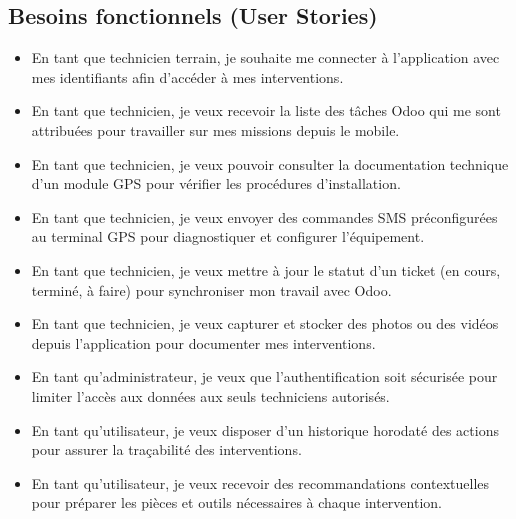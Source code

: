 \documentclass[12pt,a4paper]{report}
\begin{document}
\subsection{Besoins fonctionnels (User Stories)}
\begin{itemize}
    \item En tant que technicien terrain, je souhaite me connecter à l'application avec mes identifiants afin d'accéder à mes interventions.
    \item En tant que technicien, je veux recevoir la liste des tâches Odoo qui me sont attribuées pour travailler sur mes missions depuis le mobile.
    \item En tant que technicien, je veux pouvoir consulter la documentation technique d'un module GPS pour vérifier les procédures d'installation.
    \item En tant que technicien, je veux envoyer des commandes SMS préconfigurées au terminal GPS pour diagnostiquer et configurer l'équipement.
    \item En tant que technicien, je veux mettre à jour le statut d'un ticket (en cours, terminé, à faire) pour synchroniser mon travail avec Odoo.
    \item En tant que technicien, je veux capturer et stocker des photos ou des vidéos depuis l'application pour documenter mes interventions.
    \item En tant qu'administrateur, je veux que l'authentification soit sécurisée pour limiter l'accès aux données aux seuls techniciens autorisés.
    \item En tant qu'utilisateur, je veux disposer d'un historique horodaté des actions pour assurer la traçabilité des interventions.
    \item En tant qu'utilisateur, je veux recevoir des recommandations contextuelles pour préparer les pièces et outils nécessaires à chaque intervention.
\end{itemize}
\end{document}
